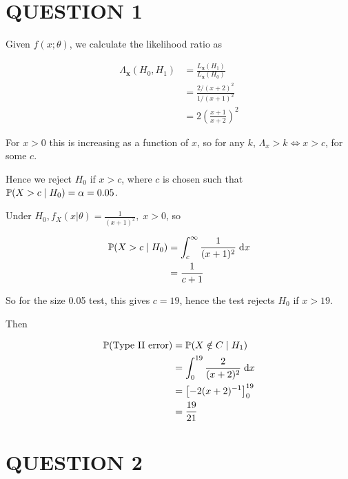 \documentclass[a4paper]{article}
\begin{document}
	
\maketitle

\section{QUESTION 1}


Given $ f(x;\theta) $, we calculate the likelihood ratio as

\begin{align*}
\Lambda_{\mathbf{x}}(H_{0},H_{1}) & =  \frac{L_{\mathbf{x}}(H_{1})}{L_{\mathbf{x}}(H_{0})} \\
& = \frac{2/(x+2)^{2}}{1/(x+1)^{2}} \\
& = 2 \left(  \frac{x+1}{x+2} \right)^{2} 
\end{align*}

For $ x > 0 $ this is increasing as a function of $ x $, so for any $ k $, $ \Lambda_{x} > k \iff x > c $, for some $ c $.

Hence we reject $ H_{0} $ if $ x > c $, where $ c $ is chosen such that $ \P( X > c \; | \; H_{0} )  = \alpha = 0.05 $. 

Under $ H_{0}, f_{X}(x | \theta) = \frac{1}{(x+1)^{2}}, \; x > 0 $, so


\begin{align*}
\P( X > c \; | \; H_{0} ) & = \int_{c}^{\infty} \frac{1}{(x+1)^{2}} \; \d x  \\
& = \frac{1}{c+1}
\end{align*}




So for the size 0.05 test, this gives $ c = 19 $, hence the test rejects $ H_{0} $ if $ x > 19 $. 

Then

\begin{align*}
\P( \text{Type II error})& = \P( X \notin C \; | \; H_{1} ) \\
& = \int_{0}^{19} \frac{2}{(x+2)^{2}} \; \d x \\
& = \left[  -2(x+2)^{-1} \right]_{0}^{19} \\
& = \frac{19}{21} 
\end{align*}




\section{QUESTION 2}
\end{document}
